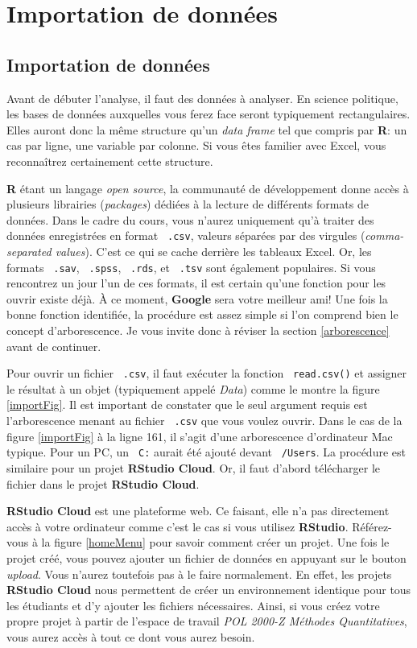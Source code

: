 \documentclass[10.5pt,a4paper]{article}
\newcommand{\rcode}[1]{\texttt{\color{rstudio} #1}}
\begin{document}
  
\section{Importation de données}\label{import}
  \subsection{Importation de données}
  Avant de débuter l'analyse, il faut des données à analyser. En science politique, les bases de données auxquelles vous ferez face seront typiquement rectangulaires. Elles auront donc la même structure qu'un \emph{data frame} tel que compris par \textbf{R}: un cas par ligne, une variable par colonne. Si vous êtes familier avec Excel, vous reconnaîtrez certainement cette structure. 
  
  \textbf{R} étant un langage \emph{open source}, la communauté de développement donne accès à plusieurs librairies (\emph{packages}) dédiées à la lecture de différents formats de données. Dans le cadre du cours, vous n'aurez uniquement qu'à traiter des données enregistrées en format \rcode{.csv}, valeurs séparées par des virgules (\emph{comma-separated values}). C'est ce qui se cache derrière les tableaux Excel. Or, les formats \rcode{.sav}, \rcode{.spss}, \rcode{.rds}, et \rcode{.tsv} sont également populaires. Si vous rencontrez un jour l'un de ces formats, il est certain qu'une fonction pour les ouvrir existe déjà. À ce moment, \textbf{Google} sera votre meilleur ami! Une fois la bonne fonction identifiée, la procédure est assez simple si l'on comprend bien le concept d'arborescence. Je vous invite donc à réviser la section \ref{arborescence} avant de continuer. 
  
  Pour ouvrir un fichier \rcode{.csv}, il faut exécuter la fonction \rcode{read.csv()} et assigner le résultat à un objet (typiquement appelé \emph{Data}) comme le montre la figure \ref{importFig}. Il est important de constater que le seul argument requis est l'arborescence menant au fichier \rcode{.csv} que vous voulez ouvrir. Dans le cas de la figure \ref{importFig} à la ligne 161, il s'agit d'une arborescence d'ordinateur Mac typique. Pour un PC, un \rcode{C:} aurait été ajouté devant \rcode{/Users}. La procédure est similaire pour un projet \textbf{RStudio Cloud}. Or, il faut d'abord télécharger le fichier dans le projet \textbf{RStudio Cloud}.
  
  \textbf{RStudio Cloud} est une plateforme web. Ce faisant, elle n'a pas directement accès à votre ordinateur comme c'est le cas si vous utilisez \textbf{RStudio}. Référez-vous à la figure \ref{homeMenu} pour savoir comment créer un projet. Une fois le projet créé, vous pouvez ajouter un fichier de données en appuyant sur le bouton \textit{upload}. Vous n'aurez toutefois pas à le faire normalement. En effet, les projets \textbf{RStudio Cloud} nous permettent de créer un environnement identique pour tous les étudiants et d'y ajouter les fichiers nécessaires. Ainsi, si vous créez votre propre projet à partir de l'espace de travail \emph{POL 2000-Z Méthodes Quantitatives}, vous aurez accès à tout ce dont vous aurez besoin. 
\end{document}
